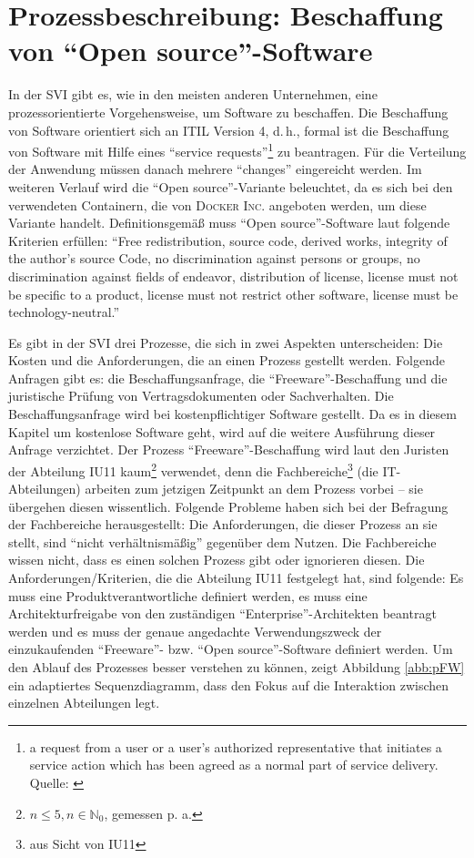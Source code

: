 \section{Prozessbeschreibung: Beschaffung von \enquote{Open source}-Software}
In der \ac{SVI} gibt es, wie in den meisten anderen Unternehmen, eine prozessorientierte Vorgehensweise, um Software zu beschaffen. Die Beschaffung von Software orientiert sich an \ac{ITIL} Version 4, d.\,h., formal ist die Beschaffung von Software mit Hilfe eines \enquote{service requests}\footnote{a request from a user or a user's authorized representative that initiates a service action which has been agreed as a normal part of service delivery. Quelle: \cite[][S.\,195]{axelos_limited_itil_2019}} zu beantragen. Für die Verteilung der Anwendung müssen danach mehrere \enquote{changes} eingereicht werden. Im weiteren Verlauf wird die \enquote{Open source}-Variante beleuchtet, da es sich bei den verwendeten Containern, die von \textsc{Docker Inc.} angeboten werden, um diese Variante handelt. Definitionsgemäß muss \enquote{Open source}-Software laut \cite{opensourceorg_open_2020} folgende Kriterien erfüllen: \enquote{Free redistribution, source code, derived works, integrity of the author's source Code, no discrimination against persons or groups, no discrimination against fields of endeavor, distribution of license, license must not be specific to a product, license must not restrict other software, license must be technology-neutral.} 
\par
Es gibt in der \ac{SVI} drei Prozesse, die sich in zwei Aspekten unterscheiden: Die Kosten und die Anforderungen, die an einen Prozess gestellt werden. Folgende Anfragen gibt es: die Beschaffungsanfrage, die \enquote{Freeware}-Beschaffung und die juristische Prüfung von Vertragsdokumenten oder Sachverhalten. Die Beschaffungsanfrage wird bei kostenpflichtiger Software gestellt. Da es in diesem Kapitel um kostenlose Software geht, wird auf die weitere Ausführung dieser Anfrage verzichtet. Der Prozess \enquote{Freeware}-Beschaffung wird laut den Juristen der Abteilung \ac{IU11} kaum\footnote{$ n \leq 5, n \in \mathbb{N}_{0} $, gemessen p. a.} verwendet, denn die Fachbereiche\footnote{aus Sicht von \ac{IU11}} (die IT-Abteilungen) arbeiten zum jetzigen Zeitpunkt an dem Prozess vorbei -- sie übergehen diesen wissentlich. Folgende Probleme haben sich bei der Befragung der Fachbereiche herausgestellt: Die Anforderungen, die dieser Prozess an sie stellt, sind \enquote{nicht verhältnismäßig} gegenüber dem Nutzen. Die Fachbereiche wissen nicht, dass es einen solchen Prozess gibt oder ignorieren diesen. Die Anforderungen/Kriterien, die die Abteilung \ac{IU11} festgelegt hat, sind folgende: Es muss eine Produktverantwortliche definiert werden, es muss eine Architekturfreigabe von den zuständigen \enquote{Enterprise}-Architekten beantragt werden und es muss der genaue angedachte Verwendungszweck der einzukaufenden \enquote{Freeware}- bzw. \enquote{Open source}-Software definiert werden. Um den Ablauf des Prozesses besser verstehen zu können, zeigt Abbildung \vref{abb:pFW} ein adaptiertes Sequenzdiagramm, dass den Fokus auf die Interaktion zwischen einzelnen Abteilungen legt.

